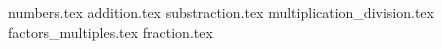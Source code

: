 \documentclass[a4paper,12pt, openany]{exam}
\begin{document}

     {numbers.tex} \newpage
     {addition.tex} \newpage
     {substraction.tex} \newpage
     {multiplication_division.tex} \newpage
     {factors_multiples.tex} \newpage
     {fraction.tex}
\end{document}
